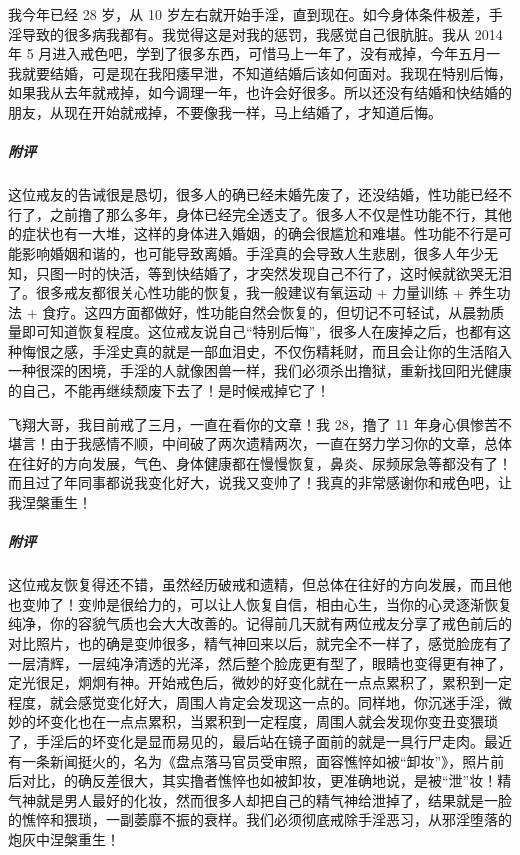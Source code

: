 \begin{case}
    我今年已经 28 岁，从 10 岁左右就开始手淫，直到现在。如今身体条件极差，手淫导致的很多病我都有。我觉得这是对我的惩罚，我感觉自己很肮脏。我从 2014 年 5 月进入戒色吧，学到了很多东西，可惜马上一年了，没有戒掉，今年五月一我就要结婚，可是现在我阳痿早泄，不知道结婚后该如何面对。我现在特别后悔，如果我从去年就戒掉，如今调理一年，也许会好很多。所以还没有结婚和快结婚的朋友，从现在开始就戒掉，不要像我一样，马上结婚了，才知道后悔。
    \subparagraph{附评} 这位戒友的告诫很是恳切，很多人的确已经未婚先废了，还没结婚，性功能已经不行了，之前撸了那么多年，身体已经完全透支了。很多人不仅是性功能不行，其他的症状也有一大堆，这样的身体进入婚姻，的确会很尴尬和难堪。性功能不行是可能影响婚姻和谐的，也可能导致离婚。手淫真的会导致人生悲剧，很多人年少无知，只图一时的快活，等到快结婚了，才突然发现自己不行了，这时候就欲哭无泪了。很多戒友都很关心性功能的恢复，我一般建议有氧运动 + 力量训练 + 养生功法 + 食疗。这四方面都做好，性功能自然会恢复的，但切记不可轻试，从晨勃质量即可知道恢复程度。这位戒友说自己“特别后悔”，很多人在废掉之后，也都有这种悔恨之感，手淫史真的就是一部血泪史，不仅伤精耗财，而且会让你的生活陷入一种很深的困境，手淫的人就像困兽一样，我们必须杀出撸狱，重新找回阳光健康的自己，不能再继续颓废下去了！是时候戒掉它了！
\end{case}

\begin{case}
    飞翔大哥，我目前戒了三月，一直在看你的文章！我 28，撸了 11 年身心俱惨苦不堪言！由于我感情不顺，中间破了两次遗精两次，一直在努力学习你的文章，总体在往好的方向发展，气色、身体健康都在慢慢恢复，鼻炎、尿频尿急等都没有了！而且过了年同事都说我变化好大，说我又变帅了！我真的非常感谢你和戒色吧，让我涅槃重生！
    \subparagraph{附评} 这位戒友恢复得还不错，虽然经历破戒和遗精，但总体在往好的方向发展，而且他也变帅了！变帅是很给力的，可以让人恢复自信，相由心生，当你的心灵逐渐恢复纯净，你的容貌气质也会大大改善的。记得前几天就有两位戒友分享了戒色前后的对比照片，也的确是变帅很多，精气神回来以后，就完全不一样了，感觉脸庞有了一层清辉，一层纯净清透的光泽，然后整个脸庞更有型了，眼睛也变得更有神了，定光很足，炯炯有神。开始戒色后，微妙的好变化就在一点点累积了，累积到一定程度，就会感觉变化好大，周围人肯定会发现这一点的。同样地，你沉迷手淫，微妙的坏变化也在一点点累积，当累积到一定程度，周围人就会发现你变丑变猥琐了，手淫后的坏变化是显而易见的，最后站在镜子面前的就是一具行尸走肉。最近有一条新闻挺火的，名为《盘点落马官员受审照，面容憔悴如被“卸妆”》，照片前后对比，的确反差很大，其实撸者憔悴也如被卸妆，更准确地说，是被“泄”妆！精气神就是男人最好的化妆，然而很多人却把自己的精气神给泄掉了，结果就是一脸的憔悴和猥琐，一副萎靡不振的衰样。我们必须彻底戒除手淫恶习，从邪淫堕落的炮灰中涅槃重生！
\end{case}

